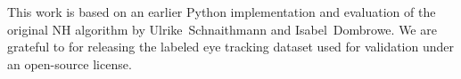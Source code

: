 \begin{acknowledgements}


This work is based on an earlier Python implementation and evaluation of the
original NH algorithm by Ulrike~Schnaithmann and Isabel~Dombrowe.  We are
grateful to \cite{Andersson2017} for releasing the labeled eye tracking dataset
used for validation under an open-source license.

\end{acknowledgements}












\clearpage
\listoftodos


